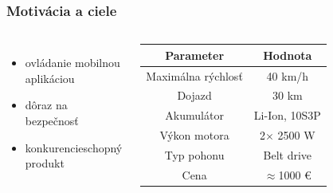   
  
  
  
  
  
  \begin{frame}
    \frametitle{Motivácia a ciele}
    \begin{columns}
      \begin{itemize}
        \item ovládanie mobilnou aplikáciou
        \item dôraz na bezpečnosť
        \item konkurencieschopný produkt
      \end{itemize}
        
      \begin{table}
        \begin{tabular}{|c|c|}
          \hline
          \textbf{Parameter} & \textbf{Hodnota} \\ \hline
          Maximálna rýchlosť & 40 km/h \\ \hline
          Dojazd & 30 km \\ \hline
          Akumulátor & Li-Ion, 10S3P \\ \hline
          Výkon motora & 2$\times$ 2500 W \\ \hline
          Typ pohonu & Belt drive \\ \hline
          Cena & $\approx$1000 € \\ \hline
        \end{tabular}
      \end{table}
    \end{columns}
  \end{frame}
  
